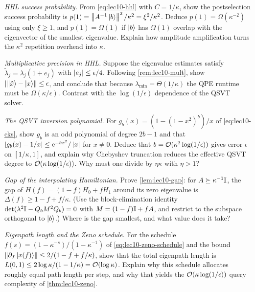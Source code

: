 \begin{exercise}\label{ex:lec10-2}
\emph{HHL success probability.} From \eqref{eq:lec10-hhl} with $C=1/\kappa$, show the
postselection success probability is $p(1)=\left\lVert A^{-1}\ket b \right\rVert^2/\kappa^2=\xi^2/\kappa^2$.
Deduce $p(1)=\Omega(\kappa^{-2})$ using only $\xi\ge1$, and $p(1)=\Omega(1)$ if $\ket b$
has $\Omega(1)$ overlap with the eigenvector of the smallest eigenvalue. Explain how
amplitude amplification turns the $\kappa^2$ repetition overhead into $\kappa$.
\end{exercise}

\begin{exercise}\label{ex:lec10-3}
\emph{Multiplicative precision in HHL.} Suppose the eigenvalue estimates satisfy
$\tilde\lambda_j=\lambda_j(1+e_j)$ with $\left\lvert e_j \right\rvert\le\epsilon/4$. Following
\cref{rem:lec10-mult}, show $\left\lVert \ket{\tilde x}-\ket x \right\rVert\le\epsilon$, and conclude that
because $\lambda_{\min}=\Theta(1/\kappa)$ the QPE runtime must be $\Omega(\kappa/\epsilon)$.
Contrast with the $\log(1/\epsilon)$ dependence of the QSVT solver.
\end{exercise}

\begin{exercise}\label{ex:lec10-4}
\emph{The QSVT inversion polynomial.} For $g_b(x)=(1-(1-x^2)^b)/x$ of
\eqref{eq:lec10-cks}, show $g_b$ is an odd polynomial of degree $2b-1$ and that
$\left\lvert g_b(x)-1/x \right\rvert\le\mathrm{e}^{-bx^2}/\left\lvert x \right\rvert$ for $x\neq0$. Deduce that
$b=\mathcal{O}(\kappa^2\log(1/\epsilon))$ gives error $\epsilon$ on $[1/\kappa,1]$, and explain
why Chebyshev truncation reduces the effective QSVT degree to
$\mathcal{O}(\kappa\log(1/\epsilon))$. Why must one divide by $\eta\kappa$ with $\eta>1$?
\end{exercise}

\begin{exercise}\label{ex:lec10-5}
\emph{Gap of the interpolating Hamiltonian.} Prove \cref{lem:lec10-gap}: for
$A\succeq\kappa^{-1}\mathbb{I}$, the gap of $H(f)=(1-f)H_0+fH_1$ around its zero eigenvalue is
$\Delta(f)\ge1-f+f/\kappa$. (Use the block-elimination identity
$\det(\lambda^2\mathbb{I}-Q_bM^2Q_b)=0$ with $M=(1-f)\mathbb{I}+fA$, and restrict to the subspace
orthogonal to $\ket b$.) Where is the gap smallest, and what value does it take?
\end{exercise}

\begin{exercise}\label{ex:lec10-6}
\emph{Eigenpath length and the Zeno schedule.} For the schedule
$f(s)=(1-\kappa^{-s})/(1-\kappa^{-1})$ of \eqref{eq:lec10-zeno-schedule} and the bound
$\left\lVert \partial_f\ket{x(f)} \right\rVert\le2/(1-f+f/\kappa)$, show that the total eigenpath length is
$L(0,1)\le 2\log\kappa/(1-1/\kappa)=\mathcal{O}(\log\kappa)$. Explain why this schedule
allocates roughly equal path length per step, and why that yields the
$\mathcal{O}(\kappa\log(1/\epsilon))$ query complexity of \cref{thm:lec10-zeno}.
\end{exercise}

